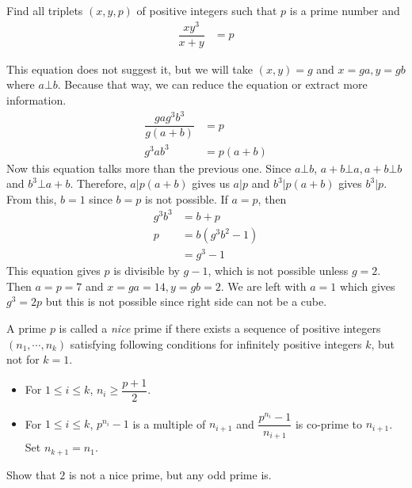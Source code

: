 \documentclass[problems.tex]{subfile}
\begin{document}
	\begin{problem}
		Find all triplets $(x, y, p)$ of positive integers such that $p$ is a prime number and
			\begin{align*}
				\dfrac{xy^3}{x+y} & = p
			\end{align*}
	\end{problem}
	
	\begin{solution}
		This equation does not suggest it, but we will take $(x,y)=g$ and $x=ga,y=gb$ where $a\bot b$. Because that way, we can reduce the equation or extract more information.
			\begin{align*}
				\dfrac{gag^3b^3}{g(a+b)} & = p\\
				g^3ab^3 & = p(a+b)
			\end{align*}
		Now this equation talks more than the previous one. Since $a\bot b$, $a+b\bot a,a+b\bot b$ and $b^3\bot a+b$. Therefore, $a|p(a+b)$ gives us $a|p$ and $b^3|p(a+b)$ gives $b^3|p$. From this, $b=1$ since $b=p$ is not possible. If $a=p$, then
			\begin{align*}
				g^3b^3 & = b+p\\
				p & = b(g^3b^2-1)\\
				  & = g^3-1
			\end{align*}
		This equation gives $p$ is divisible by $g-1$, which is not possible unless $g=2$. Then $a=p=7$ and $x=ga=14,y=gb=2$. We are left with $a=1$ which gives $g^3=2p$ but this is not possible since right side can not be a cube.
	\end{solution}
	
	\begin{problem}[Korea $2010$]
		A prime $p$ is called a \textit{nice} prime if there exists a sequence of positive integers $(n_1,\cdots,n_k)$ satisfying following conditions for infinitely positive integers $k$, but not for $k=1$.
			\begin{itemize}
				\item For $1\leq i\leq k$, $n_i\geq\dfrac{p+1}{2}$.
				\item For $1\leq i\leq k$, $p^{n_i}-1$ is a multiple of $n_{i+1}$ and $\dfrac{p^{n_i}-1}{n_{i+1}}$ is co-prime to $n_{i+1}$. Set $n_{k+1} = n_1$.
			\end{itemize}
		Show that $2$ is not a nice prime, but any odd prime is.
	\end{problem}
	
\end{document}
